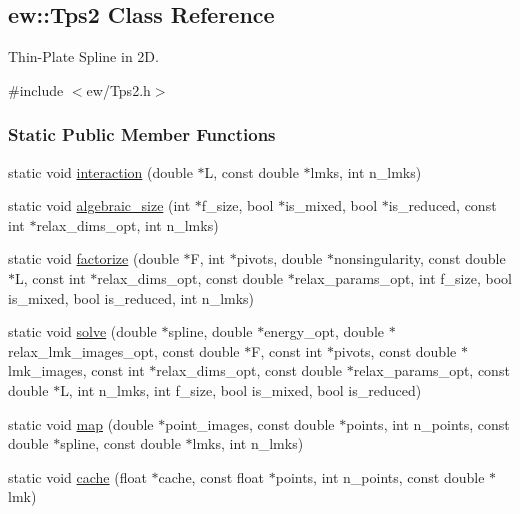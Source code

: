 \hypertarget{classew_1_1Tps2}{
\subsection{ew::Tps2 Class Reference}
\label{classew_1_1Tps2}
}


Thin-\/Plate Spline in 2D.  




{\ttfamily \#include $<$ew/Tps2.h$>$}

\subsubsection*{Static Public Member Functions}
\begin{DoxyCompactItemize}
\item 
static void \hyperlink{classew_1_1Tps2_a7f04e98fa574f821257e904658b2bb8b}{interaction} (double $\ast$L, const double $\ast$lmks, int n\_\-lmks)
\item 
static void \hyperlink{classew_1_1Tps2_a448c7039e42cb7fad800461bacc48c72}{algebraic\_\-size} (int $\ast$f\_\-size, bool $\ast$is\_\-mixed, bool $\ast$is\_\-reduced, const int $\ast$relax\_\-dims\_\-opt, int n\_\-lmks)
\item 
static void \hyperlink{classew_1_1Tps2_a07f500b8a093d45384ee6d90dd2c226a}{factorize} (double $\ast$F, int $\ast$pivots, double $\ast$nonsingularity, const double $\ast$L, const int $\ast$relax\_\-dims\_\-opt, const double $\ast$relax\_\-params\_\-opt, int f\_\-size, bool is\_\-mixed, bool is\_\-reduced, int n\_\-lmks)
\item 
static void \hyperlink{classew_1_1Tps2_a4691d5181d87c9219d8fec679cfccdcc}{solve} (double $\ast$spline, double $\ast$energy\_\-opt, double $\ast$relax\_\-lmk\_\-images\_\-opt, const double $\ast$F, const int $\ast$pivots, const double $\ast$lmk\_\-images, const int $\ast$relax\_\-dims\_\-opt, const double $\ast$relax\_\-params\_\-opt, const double $\ast$L, int n\_\-lmks, int f\_\-size, bool is\_\-mixed, bool is\_\-reduced)
\item 
static void \hyperlink{classew_1_1Tps2_a63151212e750c0254dfe24a373fae562}{map} (double $\ast$point\_\-images, const double $\ast$points, int n\_\-points, const double $\ast$spline, const double $\ast$lmks, int n\_\-lmks)
\item 
static void \hyperlink{classew_1_1Tps2_a62d594e5ce003ef4abfe05cf5e21d7a9}{cache} (float $\ast$cache, const float $\ast$points, int n\_\-points, const double $\ast$lmk)
\item 

\end{DoxyCompactItemize}
